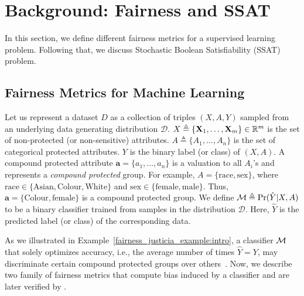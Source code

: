 \section{Background: Fairness and SSAT}
\label{fairness_justicia_sec:preliminaries}
In this section, we define different fairness metrics for a supervised learning problem. Following that, we discuss Stochastic Boolean Satisfiability (SSAT) problem.

\subsection{Fairness Metrics for Machine Learning}\label{fairness_justicia_sec:fairness}
Let us represent a dataset $D$ as a collection of triples $(X, A, Y)$ sampled from an underlying data generating distribution $\mathcal{D} $.
$X \triangleq \lbrace \mathbf{X}_1, \ldots, \mathbf{X}_m\rbrace \in \mathbb{R}^m $ is the set of non-protected (or non-sensitive) attributes.
$A \triangleq \lbrace A_1, \ldots, A_n\rbrace$ is the set of categorical protected attributes.
$Y$ is the binary label (or class) of $(X, A)$. 
A compound protected attribute $\mathbf{a} = \{a_1, \ldots, a_n\}$ is a valuation to all $A_i$'s and represents a \textit{compound protected} group. For example, $A = \{\textrm{race}, \textrm{sex}\}$, where $\textrm{race} \in \{\textrm{Asian}, \textrm{Colour}, \textrm{White}\}$ and  $\textrm{sex} \in \{\textrm{female},  \textrm{male}\}$. 
Thus, $\mathbf{a} =  \{\textrm{Colour}, \textrm{female}\}$ is a compound protected group. 
We define $\mathcal{M} \triangleq \Pr(\hat{Y}|X, A)$ to be a binary classifier trained from samples in the distribution $\mathcal{D} $. 
Here, $\hat{Y}$ is the predicted label (or class) of the corresponding data.

As we illustrated in Example~\ref{fairness_justicia_example:intro}, a classifier $\mathcal{M}$ that solely optimizes accuracy, i.e., the average number of times $\hat{Y} = Y$, may discriminate certain compound protected groups over others~\cite{chouldechova2020snapshot}.
Now, we describe two family of fairness metrics that compute bias induced by a classifier and are later verified by {\justicia}.

